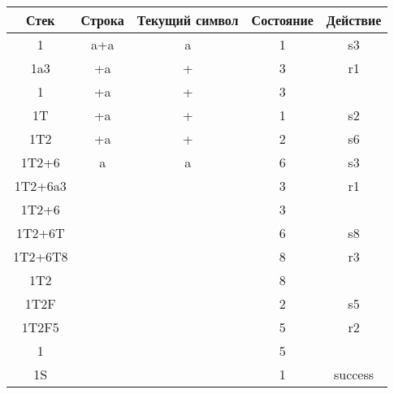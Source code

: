 \documentclass{article}
\begin{document}
\begin{center}
  \begin{tabular}{ c|c|c|c|c }
    Стек & Строка & Текущий символ & Состояние & Действие \\
    \hline
    1 & a+a & a & 1 & s3 \\
    \hline
    1a3 & +a & + & 3 & r1\\
    \hline
    1 & +a & + & 3 &  \\
    \hline
    1T & +a & + & 1 & s2 \\
    \hline 
    1T2 & +a & + & 2 & s6 \\
    \hline 
    1T2+6 & a & a & 6 & s3\\
    \hline 
    1T2+6a3 &  &  & 3 & r1\\
    \hline
    1T2+6 & &  & 3 &  \\
    \hline 
    1T2+6T &  &  & 6 & s8\\
    \hline 
    1T2+6T8 &  &  & 8 & r3 \\
    \hline
    1T2 & &  & 8 &  \\
    \hline 
    1T2F &  &  & 2 & s5 \\
    \hline 
    1T2F5 &  &  & 5 & r2 \\
    \hline 
    1 &  &  & 5 &  \\
    \hline 
    1S &  &  & 1 & success \\
  \end{tabular}
\end{center}
\end{document}

